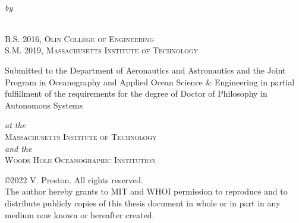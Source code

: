 \begin{titlepage}
  \begin{center}
    \begin{Large}
      \@title
    \end{Large}\\[0.1em]
    \emph{\footnotesize by}\\
    \begin{singlespace}
    {\large \@author} \\
    {\small B.S. 2016, \textsc{Olin College of Engineering}} \\ 
    {\small S.M. 2019, \textsc{Massachusetts Institute of Technology}} \\ [-0.25em]
    \end{singlespace}
    \begin{singlespace}
    {Submitted to the Department of Aeronautics and Astronautics and the Joint Program in Oceanography and Applied Ocean Science \& Engineering in partial fulfillment of the requirements for the degree of Doctor of Philosophy in Autonomous Systems} \\ [-0.25em]
    \end{singlespace}
    \emph{\footnotesize at the}\\ [-0.5em]
    {\large \textsc{Massachusetts Institute of Technology}} \\ [-0.5em]
    \emph{\footnotesize and the}\\ [-0.5em]
    {\large \textsc{Woods Hole Oceanographic Institution}} \\ [0.25em]
    \begin{singlespace}
    {\footnotesize \copyright2022 V. Preston. All rights reserved. \\ \footnotesize The author hereby grants to MIT and WHOI permission to reproduce and to distribute publicly copies of this thesis document in whole or in part in any medium now known or hereafter created.} \\ [2em]


\end{singlespace}
\end{center}
\end{titlepage}
